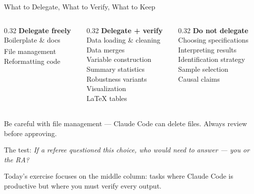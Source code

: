 \documentclass[aspectratio=169, 11pt]{beamer}
\begin{document}
\begin{frame}{What to Delegate, What to Verify, What to Keep}
  \begin{columns}[T]
    \begin{column}{0.32\textwidth}
      {\color{green!50!black}\textbf{Delegate freely}}\\[0.3em]
      {\small
      Boilerplate \& docs\\
      File management\textsuperscript{\dag}\\
      Reformatting code}
    \end{column}
    \begin{column}{0.32\textwidth}
      {\color{accent}\textbf{Delegate + verify}}\\[0.3em]
      {\small
      Data loading \& cleaning\\
      Data merges\\
      Variable construction\\
      Summary statistics\\
      Robustness variants\\
      Visualization\\
      \LaTeX{} tables}
    \end{column}
    \begin{column}{0.32\textwidth}
      {\color{red!70!black}\textbf{Do not delegate}}\\[0.3em]
      {\small
      Choosing specifications\\
      Interpreting results\\
      Identification strategy\\
      Sample selection\\
      Causal claims}
    \end{column}
  \end{columns}

  \vspace{0.5em}
  {\scriptsize \textsuperscript{\dag} Be careful with file management --- Claude Code can delete files. Always review before approving.}

  \vspace{0.5em}
  The test: \textit{If a referee questioned this choice, who would need to answer --- you or the RA?}

  \vspace{0.5em}
  Today's exercise focuses on the middle column: tasks where Claude Code is productive but where you must verify every output.
\end{frame}
\end{document}

